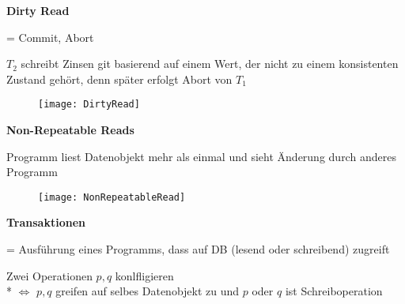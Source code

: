 \textbf{Dirty Read}
\begin{items}
	\item = Commit, Abort
	\item \( T_2 \) schreibt Zinsen git basierend auf einem Wert, der nicht zu einem konsistenten Zustand gehört, denn später erfolgt Abort von \( T_1 \)
\end{items}
\begin{figure}[H]\centering\label{DirtyRead}\texttt{[image: DirtyRead]}\end{figure}

\textbf{Non-Repeatable Reads}
\begin{items}
	\item Programm liest Datenobjekt mehr als einmal und sieht Änderung durch anderes Programm
\end{items}
\begin{figure}[H]\centering\label{NonRepeatableRead}\texttt{[image: NonRepeatableRead]}\end{figure}

\textbf{Transaktionen}
\begin{items}
	\item = Ausführung eines Programms, dass auf DB (lesend oder schreibend) zugreift
	\item Zwei Operationen \( p, q \) konlfligieren
		\\*
		\( \Leftrightarrow \) \( p,q \) greifen auf selbes Datenobjekt zu und \( p \) oder \( q \) ist Schreiboperation
\end{items}

